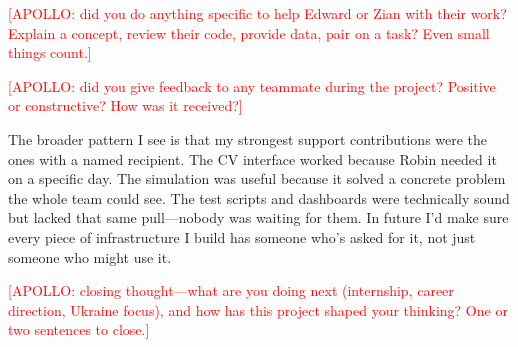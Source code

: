 \textcolor{red}{[APOLLO: did you do anything specific to help Edward or Zian with their work? Explain a concept, review their code, provide data, pair on a task? Even small things count.]}

\textcolor{red}{[APOLLO: did you give feedback to any teammate during the project? Positive or constructive? How was it received?]}

The broader pattern I see is that my strongest support contributions were the ones with a named recipient. The CV interface worked because Robin needed it on a specific day. The simulation was useful because it solved a concrete problem the whole team could see. The test scripts and dashboards were technically sound but lacked that same pull---nobody was waiting for them. In future I'd make sure every piece of infrastructure I build has someone who's asked for it, not just someone who might use it.

\textcolor{red}{[APOLLO: closing thought---what are you doing next (internship, career direction, Ukraine focus), and how has this project shaped your thinking? One or two sentences to close.]}
